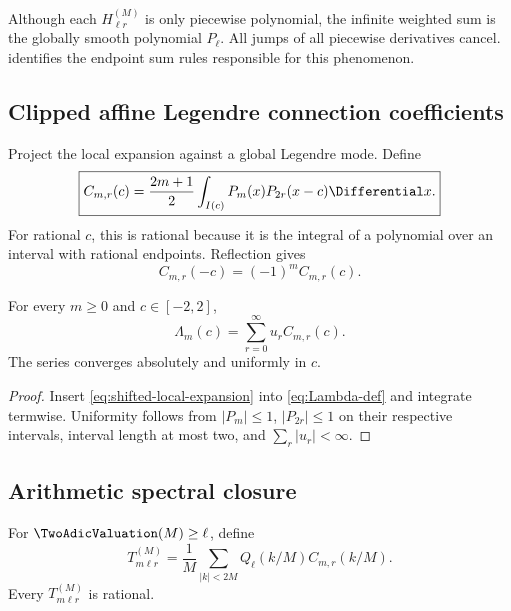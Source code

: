 \documentclass[11pt,oneside]{article}
\numberwithin{equation}{section}
\theoremstyle{definition}
\theoremstyle{remark}
\begin{document}
Although each $H_{\ell r}^{(M)}$ is only piecewise polynomial, the infinite
weighted sum is the globally smooth polynomial $P_\ell$.  All jumps of all
piecewise derivatives cancel.   identifies the endpoint
sum rules responsible for this phenomenon.

\subsection{Clipped affine Legendre connection coefficients}

Project the local expansion against a global Legendre mode.  Define
\begin{equation}
 \boxed{
 C_{m,r}(c)=\frac{2m+1}{2}
 \int_{I(c)}P_m(x)P_{2r}(x-c)\Differential x.}
 \label{eq:Cmr-def}
\end{equation}
For rational $c$, this is rational because it is the integral of a polynomial
over an interval with rational endpoints.  Reflection gives
\begin{equation}
 C_{m,r}(-c)=(-1)^mC_{m,r}(c).
 \label{eq:Cmr-parity}
\end{equation}

\begin{proposition}
\label{prop:Lambda-connection}
For every $m\ge0$ and $c\in[-2,2]$,
\begin{equation}
 \boxed{
 \Lambda_m(c)=\sum_{r=0}^{\infty}u_rC_{m,r}(c).}
 \label{eq:Lambda-C-expansion}
\end{equation}
The series converges absolutely and uniformly in $c$.
\end{proposition}

\begin{proof}
Insert \eqref{eq:shifted-local-expansion} into
\eqref{eq:Lambda-def} and integrate termwise.  Uniformity follows from
$|P_m|\le1$, $|P_{2r}|\le1$ on their respective intervals, interval length at
most two, and $\sum_r|u_r|<\infty$.
\end{proof}

\subsection{Arithmetic spectral closure}

For $\TwoAdicValuation(M)\ge\ell$, define
\begin{equation}
 \boxed{
 T_{m\ell r}^{(M)}=
 \frac1M\sum_{|k|<2M}Q_\ell(k/M)C_{m,r}(k/M).}
 \label{eq:T-def}
\end{equation}
Every $T_{m\ell r}^{(M)}$ is rational.
\end{document}
